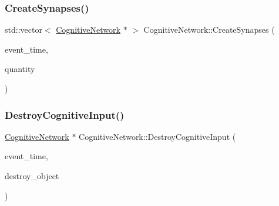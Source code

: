 \mbox{\label{classCognitiveNetwork_ae6ae16f401e7699032ac9459132763c0}} 
\subsubsection{\texorpdfstring{Create\+Synapses()}{CreateSynapses()}}
{\footnotesize\ttfamily std\+::vector$<$ \mbox{\hyperlink{classCognitiveNetwork}{Cognitive\+Network}} $\ast$ $>$ Cognitive\+Network\+::\+Create\+Synapses (\begin{DoxyParamCaption}\item[{std\+::chrono\+::time\+\_\+point$<$ \mbox{\hyperlink{universe_8h_a0ef8d951d1ca5ab3cfaf7ab4c7a6fd80}{Clock}} $>$}]{event\+\_\+time,  }\item[{int}]{quantity }\end{DoxyParamCaption})}

\mbox{\label{classCognitiveNetwork_a12e085cd47b7661190527fe55b6da8dc}} 
\subsubsection{\texorpdfstring{Destroy\+Cognitive\+Input()}{DestroyCognitiveInput()}}
{\footnotesize\ttfamily \mbox{\hyperlink{classCognitiveNetwork}{Cognitive\+Network}} $\ast$ Cognitive\+Network\+::\+Destroy\+Cognitive\+Input (\begin{DoxyParamCaption}\item[{std\+::chrono\+::time\+\_\+point$<$ \mbox{\hyperlink{universe_8h_a0ef8d951d1ca5ab3cfaf7ab4c7a6fd80}{Clock}} $>$}]{event\+\_\+time,  }\item[{\mbox{\hyperlink{classCognitiveNetwork}{Cognitive\+Network}} $\ast$}]{destroy\+\_\+object }\end{DoxyParamCaption})}

\mbox{\label{classCognitiveNetwork_a00aa44de67dd0593a2498ce7a3b4c0f2}} 
